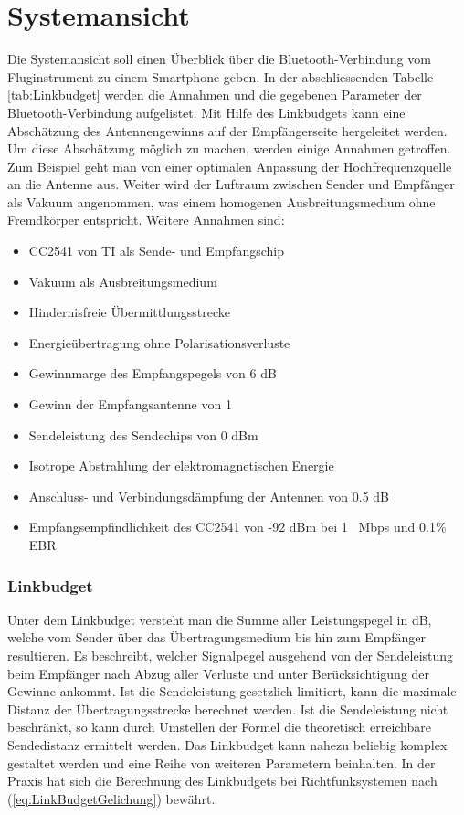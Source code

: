 \section{Systemansicht}
Die Systemansicht soll einen Überblick über die Bluetooth-Verbindung vom Fluginstrument zu einem Smartphone geben.
In der abschliessenden Tabelle \ref{tab:Linkbudget} werden die Annahmen und die gegebenen Parameter der Bluetooth-Verbindung aufgelistet. Mit Hilfe des Linkbudgets kann eine Abschätzung des Antennengewinns auf der Empfängerseite hergeleitet werden. Um diese Abschätzung möglich zu machen, werden einige Annahmen getroffen. Zum Beispiel geht man von einer optimalen Anpassung der Hochfrequenzquelle an die Antenne aus. Weiter wird der Luftraum zwischen Sender und Empfänger als Vakuum angenommen, was einem homogenen Ausbreitungsmedium ohne Fremdkörper entspricht.
Weitere Annahmen sind:
\begin{itemize}
\item CC2541 von TI als Sende- und Empfangschip
\item Vakuum als Ausbreitungsmedium
\item Hindernisfreie Übermittlungsstrecke
\item Energieübertragung ohne Polarisationsverluste
\item Gewinnmarge des Empfangspegels von 6 dB
\item Gewinn der Empfangsantenne von 1
\item Sendeleistung des Sendechips von 0 dBm
\item Isotrope Abstrahlung der elektromagnetischen Energie
\item Anschluss- und Verbindungsdämpfung der Antennen von 0.5 dB
\item Empfangsempfindlichkeit des CC2541 von -92 dBm bei 1 \ Mbps und 0.1\% EBR 
\end{itemize}


\subsubsection{Linkbudget}
Unter dem Linkbudget versteht man die Summe aller Leistungspegel in dB, welche vom Sender über das Übertragungsmedium bis hin zum Empfänger resultieren. Es beschreibt, welcher Signalpegel ausgehend von der Sendeleistung beim Empfänger nach Abzug aller Verluste und unter Berücksichtigung der Gewinne ankommt. Ist die Sendeleistung gesetzlich limitiert, kann die maximale Distanz der Übertragungsstrecke berechnet werden. Ist die Sendeleistung nicht beschränkt, so kann durch Umstellen der Formel die theoretisch erreichbare Sendedistanz ermittelt werden. Das Linkbudget kann nahezu beliebig komplex gestaltet werden und eine Reihe von weiteren Parametern beinhalten. In der Praxis hat sich die Berechnung des Linkbudgets bei Richtfunksystemen nach  (\ref{eq:LinkBudgetGelichung}) bewährt.

